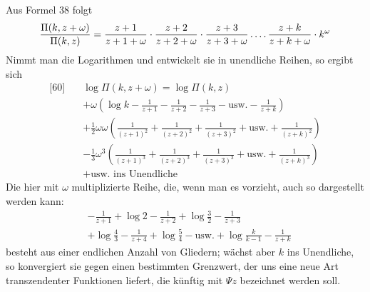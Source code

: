 Aus Formel 38 folgt
\[
\frac{\Pi(k,z+\omega)}{\Pi(k,z)}
=\frac{z+1}{z+1+\omega}\cdot\frac{z+2}{z+2+\omega}\cdot\frac{z+3}{z+3+\omega}
\mathinner{.\,.\,.\,.}\frac{z+k}{z+k+\omega}\cdot k^{\omega}
\]
Nimmt man die Logarithmen und entwickelt sie in unendliche Reihen, so ergibt sich
\[
\begin{aligned}
{}\text{[60]}\quad&\log\Pi(k,z+\omega)=\log\Pi(k,z)\\
&+\omega\left(\log k-\frac{1}{z+1}-\frac{1}{z+2}-\frac{1}{z+3}-\text{usw.}-\frac{1}{z+k}\right)\\
&+\tfrac12\omega\omega\left(\frac{1}{(z+1)^2}+\frac{1}{(z+2)^2}+\frac{1}{(z+3)^2}+\text{usw.}+\frac{1}{(z+k)^2}\right)\\
&-\tfrac13\omega^3\left(\frac{1}{(z+1)^3}+\frac{1}{(z+2)^3}+\frac{1}{(z+3)^3}+\text{usw.}+\frac{1}{(z+k)^3}\right)\\
&+\text{usw. ins Unendliche}
\end{aligned}
\]
Die hier mit $\omega$ multiplizierte Reihe, die, wenn man es vorzieht, auch so dargestellt werden kann:
\[
\begin{aligned}
&-\frac{1}{z+1}+\log 2-\frac{1}{z+2}+\log\tfrac32-\frac{1}{z+3}\\[4pt]
&+\log\tfrac43-\frac{1}{z+4}+\log\tfrac54-\text{usw.}
+\log\frac{k}{k-1}-\frac{1}{z+k}
\end{aligned}
\]
besteht aus einer endlichen Anzahl von Gliedern; wächst aber $k$ ins Unendliche, so konvergiert sie gegen einen bestimmten Grenzwert, der uns eine neue Art transzendenter Funktionen liefert, die künftig mit $\Psi z$ bezeichnet werden soll.

